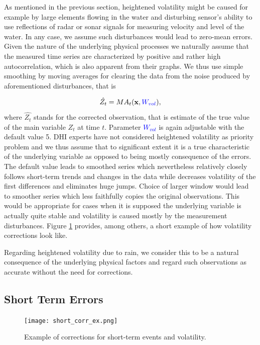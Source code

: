 \documentclass[12pt,a4paper]{article}
\begin{document}
As mentioned in the previous section, heightened volatility might be caused for example by large elements flowing in the water and disturbing sensor's ability to use reflections of radar or sonar signals for measuring velocity and level of the water.  In any case, we assume such disturbances would lead to zero-mean errors. Given the nature of the underlying physical processes we naturally assume that the measured time series are characterized  by positive and rather high autocorrelation, which is also apparent from their graphs. We thus use simple smoothing by moving averages for clearing the data from the noise produced by aforementioned disturbances, that is 

$$\hat{Z_t} = MA_t(\mathbf{x}, \textcolor{blue}{W_{vol}}),$$
where $ \hat{Z_t}$ stands for the corrected observation, that is estimate of the true value of the main variable $Z_t$ at time $t$. Parameter \textcolor{blue}{$W_{vol}$} is again adjustable with the default value 5. DHI experts have not considered heightened volatility as priority problem and we thus assume that to significant extent it is a true characteristic of the underlying variable as opposed to being mostly consequence of the errors. The default value leads to smoothed series which nevertheless relatively closely follows short-term trends and changes in the data while decreases volatility of the first differences and eliminates huge jumps. Choice of larger window would lead to smoother series which less faithfully copies the original observations. This would be appropriate for cases when it is supposed the underlying variable is actually quite stable and volatility is caused mostly by the measurement disturbances. Figure \ref{fig:short_corr_ex} provides, among others, a short example of how volatility corrections look like.

Regarding heightened volatility due to rain, we consider this to be a natural consequence of the underlying physical factors and regard such observations as accurate without the need for corrections.
 

\subsection{Short Term Errors}


\begin{figure}[htbp]
    \centering
        \texttt{[image: short\_corr\_ex.png]}        
    \caption{Example of corrections for short-term events and volatility. }
    \label{fig:short_corr_ex}
\end{figure}
\end{document}
